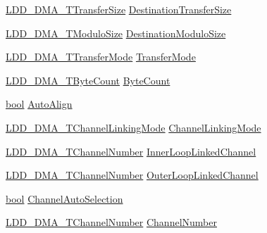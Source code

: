 \begin{DoxyCompactItemize}
\item 
\hyperlink{group___p_e___types__module_ga868f08f9448e5df27a38314f0893d84a}{L\+D\+D\+\_\+\+D\+M\+A\+\_\+\+T\+Transfer\+Size} \hyperlink{struct_l_d_d___d_m_a___t_transfer_descriptor_a6ea6bd1019f21c1724685a4fbcb1d2f6}{Destination\+Transfer\+Size}
\item 
\hyperlink{group___p_e___types__module_gacf2f2d4310e7634351c68e1f64a4c483}{L\+D\+D\+\_\+\+D\+M\+A\+\_\+\+T\+Modulo\+Size} \hyperlink{struct_l_d_d___d_m_a___t_transfer_descriptor_a9c67323380ddc015b752e2bcab4013ef}{Destination\+Modulo\+Size}
\item 
\hyperlink{group___p_e___types__module_gacd7d4c29cfce815e9e44755c0153f31b}{L\+D\+D\+\_\+\+D\+M\+A\+\_\+\+T\+Transfer\+Mode} \hyperlink{struct_l_d_d___d_m_a___t_transfer_descriptor_ad041d06753542859536a4d7d98e4e410}{Transfer\+Mode}
\item 
\hyperlink{group___p_e___types__module_gac001a681eb67942fa78ac9b62ba3b0d6}{L\+D\+D\+\_\+\+D\+M\+A\+\_\+\+T\+Byte\+Count} \hyperlink{struct_l_d_d___d_m_a___t_transfer_descriptor_a5280c130022831b517040fcc94796573}{Byte\+Count}
\item 
\hyperlink{group___p_e___types__module_ga97a80ca1602ebf2303258971a2c938e2}{bool} \hyperlink{struct_l_d_d___d_m_a___t_transfer_descriptor_afeb4d9887d658aebdcacc19e229bf69d}{Auto\+Align}
\item 
\hyperlink{group___p_e___types__module_ga7a25c76afefd56aca723c89d7098c89b}{L\+D\+D\+\_\+\+D\+M\+A\+\_\+\+T\+Channel\+Linking\+Mode} \hyperlink{struct_l_d_d___d_m_a___t_transfer_descriptor_ab8054eb02425e6367362d87ceb5e16b6}{Channel\+Linking\+Mode}
\item 
\hyperlink{group___p_e___types__module_gad268d607015891269cb015faa8bc0dac}{L\+D\+D\+\_\+\+D\+M\+A\+\_\+\+T\+Channel\+Number} \hyperlink{struct_l_d_d___d_m_a___t_transfer_descriptor_a17a799ba61cfc3d0345e4ee82340cc58}{Inner\+Loop\+Linked\+Channel}
\item 
\hyperlink{group___p_e___types__module_gad268d607015891269cb015faa8bc0dac}{L\+D\+D\+\_\+\+D\+M\+A\+\_\+\+T\+Channel\+Number} \hyperlink{struct_l_d_d___d_m_a___t_transfer_descriptor_aa33953a3b83351822ad5e82e497d6886}{Outer\+Loop\+Linked\+Channel}
\item 
\hyperlink{group___p_e___types__module_ga97a80ca1602ebf2303258971a2c938e2}{bool} \hyperlink{struct_l_d_d___d_m_a___t_transfer_descriptor_aa4695ea091b3c7b3c3720b7a11a35713}{Channel\+Auto\+Selection}
\item 
\hyperlink{group___p_e___types__module_gad268d607015891269cb015faa8bc0dac}{L\+D\+D\+\_\+\+D\+M\+A\+\_\+\+T\+Channel\+Number} \hyperlink{struct_l_d_d___d_m_a___t_transfer_descriptor_a203b693a350df7170042dd0c18ffd6bb}{Channel\+Number}

\end{DoxyCompactItemize}
